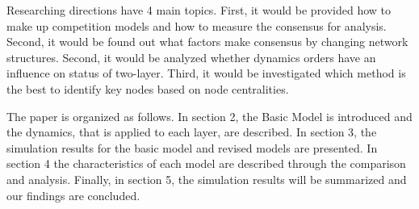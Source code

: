 Researching directions have 4 main topics. First, it would be provided how to make up competition models and how to measure the consensus for analysis. Second, it would be found out what factors make consensus by changing network structures. Second, it would be analyzed whether dynamics orders have an influence on status of two-layer. Third, it would be investigated which method is the best to identify key nodes based on node centralities.

The paper is organized as follows. In section 2, the Basic Model is introduced and the dynamics, that is applied to each layer, are described.  In section 3, the simulation results for the basic model and revised models are presented. In section 4 the characteristics of each model are described through the comparison and analysis. Finally, in section 5, the simulation results will be summarized and our findings are concluded.

